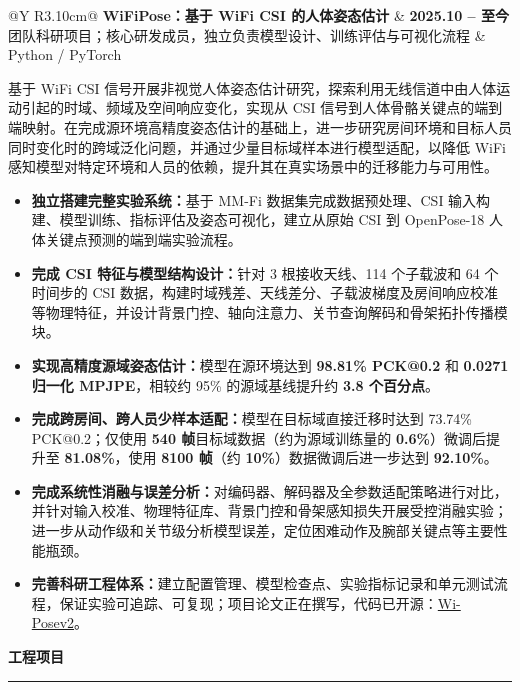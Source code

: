 \documentclass[10pt,a4paper]{article}
\makeatletter
\newcommand{\cvsection}[1]{
  \Needspace{2.2\baselineskip}

  \vspace{7.5pt}

  {\fontsize{11.5}{12.0}\selectfont
   \bfseries
   \color{Accent}
   #1\par
  }

  \nointerlineskip
  \vspace{1.2pt}

  {\color{Rule}\rule{\textwidth}{0.65pt}}\par

  \vspace{2.4pt}
}
\newenvironment{cvitems}{
  \begin{itemize}[
    leftmargin=1.30em,
    label=\textcolor{Accent}{
      \raisebox{0.15ex}{\scriptsize\textbullet}
    },
    topsep=0.6pt,
    itemsep=1.1pt,
    parsep=0pt,
    partopsep=0pt
  ]
  \justifying
}{
  \end{itemize}
}
\newcommand{\researchentry}[5]{
  \Needspace{2.8\baselineskip}

  \begin{tabularx}{\textwidth}{@{}Y R{3.10cm}@{}}
    {\bfseries #1}
    &
    {\bfseries #4}
    \\[-0.3pt]

    {\color{Muted}#2}
    &
    {\color{Muted}#3}
  \end{tabularx}

  \vspace{-1.3pt}

  #5

  \vspace{0.2pt}
}
\makeatother
\begin{document}
\researchentry
{WiFiPose：基于 WiFi CSI 的人体姿态估计}
{团队科研项目；核心研发成员，独立负责模型设计、训练评估与可视化流程}
{Python / PyTorch}
{2025.10 -- 至今}
{
基于 WiFi CSI 信号开展非视觉人体姿态估计研究，探索利用无线信道中由人体运动引起的时域、频域及空间响应变化，实现从 CSI 信号到人体骨骼关键点的端到端映射。在完成源环境高精度姿态估计的基础上，进一步研究房间环境和目标人员同时变化时的跨域泛化问题，并通过少量目标域样本进行模型适配，以降低 WiFi 感知模型对特定环境和人员的依赖，提升其在真实场景中的迁移能力与可用性。

\begin{cvitems}

  \item \textbf{独立搭建完整实验系统：}基于 MM-Fi 数据集完成数据预处理、CSI 输入构建、模型训练、指标评估及姿态可视化，建立从原始 CSI 到 OpenPose-18 人体关键点预测的端到端实验流程。

  \item \textbf{完成 CSI 特征与模型结构设计：}针对 3 根接收天线、114 个子载波和 64 个时间步的 CSI 数据，构建时域残差、天线差分、子载波梯度及房间响应校准等物理特征，并设计背景门控、轴向注意力、关节查询解码和骨架拓扑传播模块。

  \item \textbf{实现高精度源域姿态估计：}模型在源环境达到 \textbf{98.81\% PCK@0.2} 和 \textbf{0.0271 归一化 MPJPE}，相较约 95\% 的源域基线提升约 \textbf{3.8 个百分点}。

  \item \textbf{完成跨房间、跨人员少样本适配：}模型在目标域直接迁移时达到 73.74\% PCK@0.2；仅使用 \textbf{540 帧}目标域数据（约为源域训练量的 \textbf{0.6\%}）微调后提升至 \textbf{81.08\%}，使用 \textbf{8100 帧}（约 \textbf{10\%}）数据微调后进一步达到 \textbf{92.10\%}。

  \item \textbf{完成系统性消融与误差分析：}对编码器、解码器及全参数适配策略进行对比，并针对输入校准、物理特征库、背景门控和骨架感知损失开展受控消融实验；进一步从动作级和关节级分析模型误差，定位困难动作及腕部关键点等主要性能瓶颈。

  \item \textbf{完善科研工程体系：}建立配置管理、模型检查点、实验指标记录和单元测试流程，保证实验可追踪、可复现；项目论文正在撰写，代码已开源：\href{https://github.com/allforkarina/Wi-Posev2}{Wi-Posev2}。

\end{cvitems}
}


\cvsection{工程项目}
\end{document}
